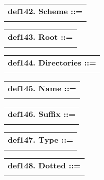 \documentclass{report}
\begin{document}
\begin{tabular}{l}
{\bf def142. Scheme ::= }\\ 
\hspace*{3mm}{\tt Word ":"} \\ 
\end{tabular}

\begin{tabular}{l}
{\bf def143. Root ::= }\\ 
\hspace*{3mm}{\tt "//" Dotted} \\ 
\end{tabular}

\begin{tabular}{l}
{\bf def144. Directories ::= }\\ 
\hspace*{3mm}{\tt {[}("/"){]} (Dotted "/")++} \\ 
\end{tabular}

\begin{tabular}{l}
{\bf def145. Name ::= }\\ 
\hspace*{3mm}{\tt Word} \\ 
\end{tabular}

\begin{tabular}{l}
{\bf def146. Suffix ::= }\\ 
\hspace*{3mm}{\tt "." Word} \\ 
\end{tabular}

\begin{tabular}{l}
{\bf def147. Type ::= }\\ 
\hspace*{3mm}{\tt ";" Word} \\ 
\end{tabular}

\begin{tabular}{l}
{\bf def148. Dotted ::= }\\ 
\hspace*{3mm}{\tt Word++ "."} \\ 
\end{tabular}
\end{document}

